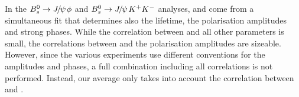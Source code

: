 In the $B^0_s\to{J\mskip -3mu/\mskip -2mu\psi\mskip 2mu}\phi$ and $B^0_s\to{J\mskip -3mu/\mskip -2mu\psi\mskip 2mu} K^+K^-$ analyses, \phiccbars and \DGs 
come from a simultaneous fit that determines also the \Bs lifetime,
the polarisation amplitudes and strong phases.
While the correlation between \phiccbars and all other parameters is small,
the correlations between \DGs and the polarisation amplitudes are sizeable.
However, since the various experiments use different conventions
for the amplitudes and phases, a full combination including all
correlations is not performed. Instead, our average only takes
into account the correlation between \phiccbars and \DGs.


